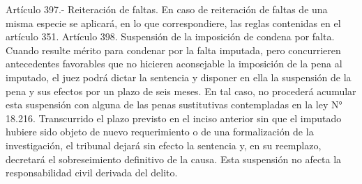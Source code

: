     Artículo 397.- Reiteración de faltas. En caso de reiteración de faltas de una misma especie se aplicará, en lo que correspondiere, las reglas contenidas en el artículo 351.
    Artículo 398. Suspensión de la imposición de condena por falta. Cuando resulte mérito para condenar por la falta imputada, pero concurrieren antecedentes favorables que no hicieren aconsejable la imposición de la pena al imputado, el juez podrá dictar la sentencia y disponer en ella la suspensión de la pena y sus efectos por un plazo de seis meses. En tal caso, no procederá acumular esta suspensión con alguna de las penas sustitutivas contempladas en la ley N° 18.216.
    Transcurrido el plazo previsto en el inciso anterior sin que el imputado hubiere sido objeto de nuevo requerimiento o de una formalización de la investigación, el tribunal dejará sin efecto la sentencia y, en su reemplazo, decretará el sobreseimiento definitivo de la causa.
    Esta suspensión no afecta la responsabilidad civil derivada del delito.


